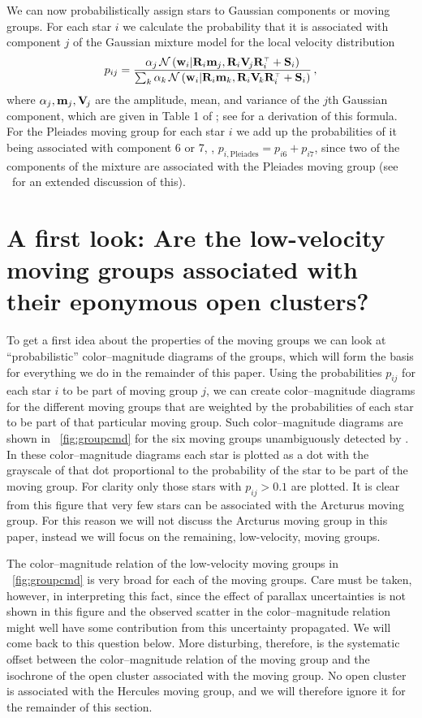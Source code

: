 We can now probabilistically assign stars to Gaussian components or
moving groups. For each star $i$ we calculate the probability that it
is associated with component $j$ of the Gaussian mixture model for the
local velocity distribution
\begin{equation}\label{eq:pij}
p_{ij} = \frac{\alpha_j\,\mathcal{N}\left(\mathbf{w}_i | \mathbf{R}_i \mathbf{m}_j, \mathbf{R}_i \mathbf{V}_{\!j}
\mathbf{R}_i^{\scriptscriptstyle \top} + \mathbf{S}_i\right)}{\sum_k\alpha_k\,\mathcal{N}\left(\mathbf{w}_i | \mathbf{R}_i \mathbf{m}_k, \mathbf{R}_i \mathbf{V}_{\!k}
\mathbf{R}_i^{\scriptscriptstyle \top}+\mathbf{S}_i\right)}\,,
\end{equation}
where $\alpha_j,\mathbf{m}_j,\mathbf{V}_{\!j}$ are the amplitude, mean, and variance of
the $j$th Gaussian component, which are given in Table 1 of \bhr; see
\citet{BovyXD} for a derivation of this formula. For the Pleiades
moving group for each star $i$ we add up the probabilities of it being
associated with component 6 or 7, \ie, $p_{i,\mathrm{Pleiades}} =
p_{i6}+p_{i7}$, since two of the components of the mixture are
associated with the Pleiades moving group (see \bhr\ for an extended
discussion of this).



\section{A first look: Are the low-velocity moving groups associated with their eponymous open clusters?}\label{sec:firstlook}

To get a first idea about the properties of the moving groups we can
look at ``probabilistic'' color--magnitude diagrams of the groups,
which will form the basis for everything we do in the remainder of
this paper. Using the probabilities $p_{ij}$ for each star $i$ to be
part of moving group $j$, we can create color--magnitude diagrams for
the different moving groups that are weighted by the probabilities of
each star to be part of that particular moving group. Such
color--magnitude diagrams are shown in \figurename~\ref{fig:groupcmd}
for the six moving groups unambiguously detected by \bhr. In these
color--magnitude diagrams each star is plotted as a dot with the
grayscale of that dot proportional to the probability of the star to
be part of the moving group. For clarity only those stars with $p_{ij}
> 0.1$ are plotted. It is clear from this figure that very few stars
can be associated with the Arcturus moving group. For this reason we
will not discuss the Arcturus moving group in this paper, instead we
will focus on the remaining, low-velocity, moving groups.

The color--magnitude relation of the low-velocity moving groups in
\figurename~\ref{fig:groupcmd} is very broad for each of the moving
groups. Care must be taken, however, in interpreting this fact, since
the effect of parallax uncertainties is not shown in this figure and
the observed scatter in the color--magnitude relation might well have
some contribution from this uncertainty propagated. We will come back
to this question below. More disturbing, therefore, is the systematic
offset between the color--magnitude relation of the moving group and
the isochrone of the open cluster associated with the moving group. No
open cluster is associated with the Hercules moving group, and we will
therefore ignore it for the remainder of this section.


